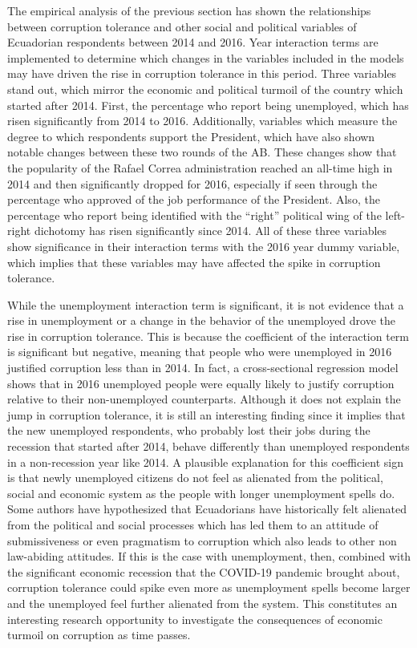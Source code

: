 \documentclass[floatsintext,man]{apa7}\usepackage[]{graphicx}\usepackage[]{color}
\begin{document}
The empirical analysis of the previous section has shown the relationships between corruption tolerance and other social and political variables of Ecuadorian respondents between 2014 and 2016. Year interaction terms are implemented to determine which changes in the variables included in the models may have driven the rise in corruption tolerance in this period. Three variables stand out, which mirror the economic and political turmoil of the country which started after 2014. First, the percentage who report being unemployed, which has risen significantly from 2014 to 2016. Additionally, variables which measure the degree to which respondents support the President, which have also shown notable changes between these two rounds of the AB. These changes show that the popularity of the Rafael Correa administration reached an all-time high in 2014 and then significantly dropped for 2016, especially if seen through the percentage who approved of the job performance of the President. Also, the percentage who report being identified with the \enquote{right} political wing of the left-right dichotomy has risen significantly since 2014. All of these three variables show significance in their interaction terms with the 2016 year dummy variable, which implies that these variables may have affected the spike in corruption tolerance. 

While the unemployment interaction term is significant, it is not evidence that a rise in unemployment or a change in the behavior of the unemployed drove the rise in corruption tolerance. This is because the coefficient of the interaction term is significant but negative, meaning that people who were unemployed in 2016 justified corruption less than in 2014. In fact, a cross-sectional regression model shows that in 2016 unemployed people were equally likely to justify corruption relative to their non-unemployed counterparts. Although it does not explain the jump in corruption tolerance, it is still an interesting finding since it implies that the new unemployed respondents, who probably lost their jobs during the recession that started after 2014, behave differently than unemployed respondents in a non-recession year like 2014. A plausible explanation for this coefficient sign is that newly unemployed citizens do not feel as alienated from the political, social and economic system as the people with longer unemployment spells do. Some authors have hypothesized that Ecuadorians have historically felt alienated from the political and social processes which has led them to an attitude of submissiveness or even pragmatism to corruption which also leads to other non law-abiding attitudes. If this is the case with unemployment, then, combined with the significant economic recession that the COVID-19 pandemic brought about, corruption tolerance could spike even more as unemployment spells become larger and the unemployed feel further alienated from the system. This constitutes an interesting research opportunity to investigate the consequences of economic turmoil on corruption as time passes. 
\end{document}
